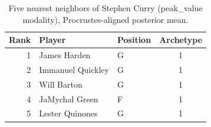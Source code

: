 \begin{table}[htbp]
  \centering\small
  \begin{tabular}{rllc}
    \toprule
    Rank & Player & Position & Archetype \\
    \midrule
    1 & James Harden & G & 1 \\
    2 & Immanuel Quickley & G & 1 \\
    3 & Will Barton & G & 1 \\
    4 & JaMychal Green & F & 1 \\
    5 & Lester Quinones & G & 1 \\
    \bottomrule
  \end{tabular}
  \caption{Five nearest neighbors of Stephen Curry (peak_value modality), Procrustes-aligned posterior mean.}
  \label{tab:Stephen_Curry_neighbors_peak_value}
\end{table}

